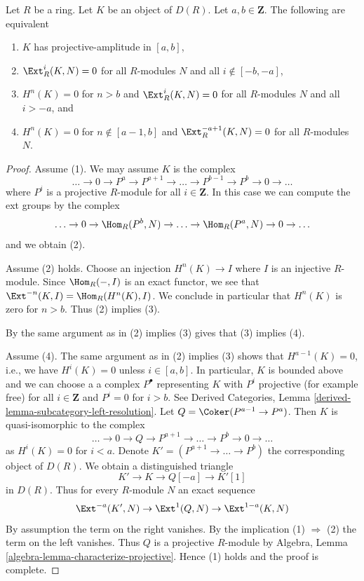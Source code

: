 \begin{lemma}
\label{lemma-projective-amplitude}
Let $R$ be a ring. Let $K$ be an object of $D(R)$. Let $a, b \in \mathbf{Z}$.
The following are equivalent
\begin{enumerate}
\item $K$ has projective-amplitude in $[a, b]$,
\item $\Ext^i_R(K, N) = 0$ for all $R$-modules $N$ and all
$i \not \in [-b, -a]$,
\item $H^n(K) = 0$ for $n > b$ and
$\Ext^i_R(K, N) = 0$ for all $R$-modules $N$ and all $i > -a$, and
\item $H^n(K) = 0$ for $n \not \in [a - 1, b]$ and
$\Ext^{-a + 1}_R(K, N) = 0$ for all $R$-modules $N$.
\end{enumerate}
\end{lemma}

\begin{proof}
Assume (1). We may assume $K$ is the complex
$$
\ldots \to 0 \to P^a \to P^{a + 1} \to \ldots \to
P^{b - 1} \to P^b \to 0 \to \ldots
$$
where $P^i$ is a projective $R$-module for all $i \in \mathbf{Z}$.
In this case we can compute the ext groups by the complex
$$
\ldots \to 0 \to \Hom_R(P^b, N) \to \ldots \to
\Hom_R(P^a, N) \to 0 \to \ldots
$$
and we obtain (2).

\medskip\noindent
Assume (2) holds. Choose an injection $H^n(K) \to I$ where $I$
is an injective $R$-module. Since $\Hom_R(-, I)$ is an exact functor,
we see that $\Ext^{-n}(K, I) = \Hom_R(H^n(K), I)$.
We conclude in particular that $H^n(K)$ is zero for $n > b$.
Thus (2) implies (3).

\medskip\noindent
By the same argument as in (2) implies (3) gives that (3) implies (4).

\medskip\noindent
Assume (4). The same argument as in (2) implies (3) shows that
$H^{a - 1}(K) = 0$, i.e., we have $H^i(K) = 0$ unless $i \in [a, b]$.
In particular, $K$ is bounded above and we can choose a
a complex $P^\bullet$ representing $K$ with $P^i$ projective
(for example free) for all $i \in \mathbf{Z}$ and $P^i = 0$ for $i > b$.
See Derived Categories, Lemma
\ref{derived-lemma-subcategory-left-resolution}.
Let $Q = \Coker(P^{a - 1} \to P^a)$. Then $K$ is quasi-isomorphic
to the complex
$$
\ldots \to 0 \to Q \to P^{a + 1} \to \ldots \to P^b \to 0 \to \ldots
$$
as $H^i(K) = 0$ for $i < a$.
Denote $K' = (P^{a + 1} \to \ldots \to P^b)$ the corresponding object of
$D(R)$. We obtain a distinguished triangle
$$
K' \to K \to Q[-a] \to K'[1]
$$
in $D(R)$. Thus for every $R$-module $N$ an exact sequence
$$
\Ext^{-a}(K', N) \to \Ext^1(Q, N) \to \Ext^{1 - a}(K, N)
$$
By assumption the term on the right vanishes. By the implication
(1) $\Rightarrow$ (2) the term on the left vanishes. Thus $Q$
is a projective $R$-module by
Algebra, Lemma \ref{algebra-lemma-characterize-projective}.
Hence (1) holds and the proof is complete.
\end{proof}

